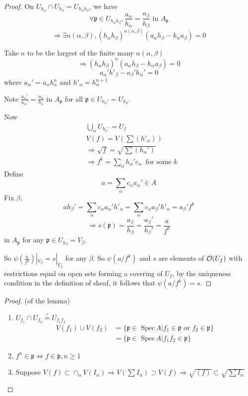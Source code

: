 \documentclass[11pt]{article}
\newcommand{\spec}{\text{ Spec}\,}
\newcommand{\scp}{{\mathfrak p}}
\newcommand{\calo}{{\cal O}}
\newcommand{\Lrta}{\Longrightarrow}
\newcommand{\Llrta}{\Longleftrightarrow}
\begin{document}
\begin{proof}
On $U_{h_\alpha}\cap U_{h_\beta}=U_{h_\alpha h_\beta}$, we have
$$
\forall \scp \in U_{h_\alpha h_\beta}, \frac{a_\alpha}{h_\alpha}=\frac{a_\beta}{h_\beta}\text{  in } A_\scp
$$
$$
\Lrta \exists n(\alpha, \beta), (h_\alpha h_\beta)^{n(\alpha, \beta)}(a_\alpha h_\beta-h_\alpha a_\beta)=0
$$

Take $n$ to be the largest of the finite many $n(\alpha,\beta)$
$$
\Lrta(h_\alpha h_\beta)^{n}(a_\alpha h_\beta-h_\alpha a_\beta)=0
$$
$$
a_\alpha' h'_\beta-a_\beta' h_\alpha'=0
$$
where $a_\alpha'=a_\alpha h_\alpha^n$ and $h'_\alpha=h_{\alpha}^{n+1}$

Note 
$\frac{a_\alpha'}{h_\alpha'}=\frac{a_\alpha}{h_\alpha}$ in $A_\scp$ for all $\scp\in U_{h_\alpha'}=U_{h_\alpha}$.

Now
$$
\begin{aligned}
& \bigcup_\alpha U_{h_\alpha'}=U_f\\
& V(f)=V(\sum (h'_\alpha))\\
&\Lrta \sqrt{f}=\sqrt{\sum(h_\alpha')}\\
& \Lrta f^k =\sum_\alpha h_\alpha' c_\alpha\ \text{ for some } k
\end{aligned}
$$
Define 
$$
a=\sum_\alpha c_\alpha a_\alpha'\in A
$$
Fix $\beta$,
$$
a h_\beta'=\sum_\alpha c_\alpha a_\alpha' h'_\alpha=\sum_\alpha c_\alpha a_\beta' h'_\alpha
=a_\beta' f^k
$$
$$
\Lrta s(\scp)=\frac{a_\beta}{h_\beta}= \frac{a_\beta'}{h_\beta'}=\frac{a
}{f^k}
$$
in $A_\scp $ for any $\scp \in U_{h_\beta}=V_\beta$.

So $\psi(\frac{a}{f^k})|_{V_\beta}=s|_{V_\beta}$ for any $\beta$.
So $\psi(a/f^k)$ and $s$ are elements of $\calo(U_f)$ with restrictions equal on open sets forming a covering of $U_f$, by the uniqueness condition in the definition of sheaf, it follows that $\psi(a/f^k)=s$.
\end{proof}


\begin{proof}(of the lemma)
\begin{enumerate}[label=(\arabic*)]
\item $U_{f_1}\cap U_{f_2}\overset{?}{=}U_{f_1 f_2}$
$$
\begin{aligned}
V(f_1)\cup V(f_2)&=\{\scp\in \spec A|f_1\in \scp \text{ or } f_2\in\scp \}\\
&=\{\scp\in\spec A|f_1f_2\in \scp\}
\end{aligned}
$$
\item $f^n\in \scp \Llrta f\in\scp, n\geq1$
\item Suppose $V(f)\subset \cap_\alpha V(I_\alpha)\Lrta V(\sum I_\alpha)\supset V(f)\Lrta \sqrt{(f)}\subset \sqrt{\sum I_\alpha}$
\end{enumerate}
\end{proof}
\end{document}
